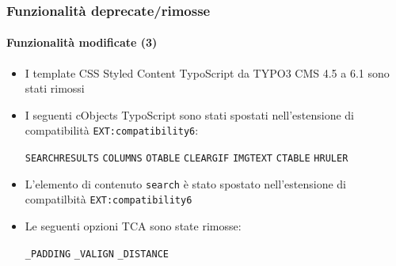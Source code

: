 \begin{frame}[fragile]
	\frametitle{Funzionalità deprecate/rimosse}
	\framesubtitle{Funzionalità modificate (3)}

	\begin{itemize}
		\item I template CSS Styled Content TypoScript da TYPO3 CMS 4.5 a 6.1 sono stati rimossi

		\item I seguenti cObjects TypoScript sono stati spostati nell'estensione di compatibilità
			\texttt{EXT:compatibility6}:

			\vspace{0.2cm}

			\small
				\texttt{SEARCHRESULTS} \tabto{3cm}\texttt{COLUMNS} \tabto{6cm}\texttt{OTABLE} \tabto{9cm}\texttt{CLEARGIF}\newline
				\texttt{IMGTEXT}       \tabto{3cm}\texttt{CTABLE}  \tabto{6cm}\texttt{HRULER}
			\normalsize

		\item L'elemento di contenuto \texttt{search} è stato spostato nell'estensione di compatilbità \texttt{EXT:compatibility6}

		\item Le seguenti opzioni TCA sono state rimosse:

			\vspace{0.2cm}

			\small
				\texttt{\_PADDING} \tabto{3cm}\texttt{\_VALIGN} \tabto{6cm}\texttt{\_DISTANCE}
			\normalsize

	\end{itemize}

\end{frame}


